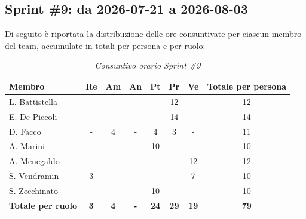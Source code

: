 ﻿\documentclass[a4paper, 10pt, colorlinks=true, linkcolor=black, urlcolor=blue, citecolor=blue, hidelinks]{article}
\renewcommand{\arraystretch}{1.2}
\begin{document}
\subsection{Sprint \#9: da 2026-07-21 a 2026-08-03}
Di seguito è riportata la distribuzione delle ore consuntivate per ciascun membro del team, accumulate in totali per persona e per ruolo:

\begin{table}[H]
    \centering
    \renewcommand{\arraystretch}{1.4}
    \begin{tabular}{|l|c|c|c|c|c|c|c|}
        \hline
        \rowcolor{bluBitless!15}
        \textbf{Membro} & \textbf{Re} & \textbf{Am} & \textbf{An} & \textbf{Pt} & \textbf{Pr} & \textbf{Ve} & \textbf{Totale per persona} \\
        \hline
        L. Battistella & - & - & - & - & 12 & - & 12 \\ \hline
        E. De Piccoli & - & - & - & - & 14 & - & 14 \\ \hline
        D. Facco & - & 4 & - & 4 & 3 & - & 11 \\ \hline
        A. Marini & - & - & - & 10 & - & - & 10 \\ \hline
        A. Menegaldo & - & - & - & - & - & 12 & 12 \\ \hline
        S. Vendramin & 3 & - & - & - & - & 7 & 10 \\ \hline
        S. Zecchinato & - & - & - & 10 & - & - & 10 \\ \hline
        \rowcolor{bluBitless!8}
        \textbf{Totale per ruolo} & \textbf{3} & \textbf{4} & \textbf{-} & \textbf{24} & \textbf{29} & \textbf{19} & \textbf{79} \\
        \hline
    \end{tabular}
    \caption{\textit{Consuntivo orario Sprint \#9}}
\end{table}
\end{document}
